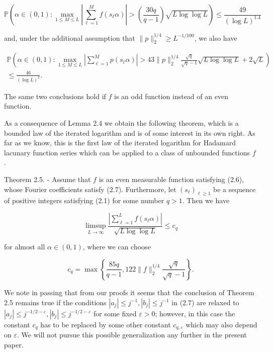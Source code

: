 \documentclass[10pt]{article}
\begin{document}
$$
\mathbb{P}\left(\alpha \in(0,1): \max _{1 \leqslant M \leqslant L}\left|\sum_{\ell=1}^{M} f\left(s_{\ell} \alpha\right)\right|>\left(\frac{30 q}{q-1}\right) \sqrt{L \log \log L}\right) \leqslant \frac{49}{(\log L)^{1.4}}
$$

and, under the additional assumption that $\|p\|_{2}^{1 / 4} \geqslant L^{-1 / 100}$, we also have

$$
\begin{array}{r}
\mathbb{P}\left(\alpha \in(0,1): \max _{1 \leqslant M \leqslant L}\left|\sum_{\ell=1}^{M} p\left(s_{\ell} \alpha\right)\right|>43\|p\|_{2}^{1 / 4} \frac{\sqrt{q}}{\sqrt{q}-1} \sqrt{L \log \log L}+2 \sqrt{L}\right) \\
\leqslant \frac{46}{(\log L)^{2}} .
\end{array}
$$

The same two conclusions hold if $f$ is an odd function instead of an even function.

As a consequence of Lemma 2.4 we obtain the following theorem, which is a bounded law of the iterated logarithm and is of some interest in its own right. As far as we know, this is the first law of the iterated logarithm for Hadamard lacunary function series which can be applied to a class of unbounded functions $f$.

Theorem 2.5. - Assume that $f$ is an even measurable function satisfying (2.6), whose Fourier coefficients satisfy (2.7). Furthermore, let $\left(s_{\ell}\right)_{\ell \geqslant 1}$ be a sequence of positive integers satisfying (2.1) for some number $q>1$. Then we have

$$
\limsup _{L \rightarrow \infty} \frac{\left|\sum_{\ell=1}^{L} f\left(s_{\ell} \alpha\right)\right|}{\sqrt{L \log \log L}} \leqslant c_{q}
$$

for almost all $\alpha \in(0,1)$, where we can choose

$$
c_{q}=\max \left\{\frac{85 q}{q-1}, 122\|f\|_{2}^{1 / 4} \frac{\sqrt{q}}{\sqrt{q}-1}\right\} .
$$

We note in passing that from our proofs it seems that the conclusion of Theorem 2.5 remains true if the conditions $\left|a_{j}\right| \leqslant j^{-1},\left|b_{j}\right| \leqslant j^{-1}$ in (2.7) are relaxed to $\left|a_{j}\right| \leqslant j^{-1 / 2-\varepsilon},\left|b_{j}\right| \leqslant j^{-1 / 2-\varepsilon}$ for some fixed $\varepsilon>0$; however, in this case the constant $c_{q}$ has to be replaced by some other constant $c_{q, \varepsilon}$ which may also depend on $\varepsilon$. We will not pursue this possible generalization any further in the present paper.
\end{document}
